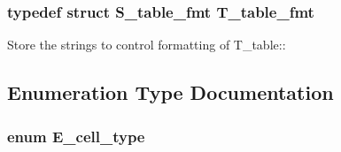 \subsubsection{\setlength{\rightskip}{0pt plus 5cm}typedef struct {\bf S\_\-table\_\-fmt}  T\_\-table\_\-fmt}\label{table_8h_a7}


Store the strings to control formatting of T\_\-table:: 

\subsection{Enumeration Type Documentation}
\subsubsection{\setlength{\rightskip}{0pt plus 5cm}enum E\_\-cell\_\-type}\label{table_8h_a37}


